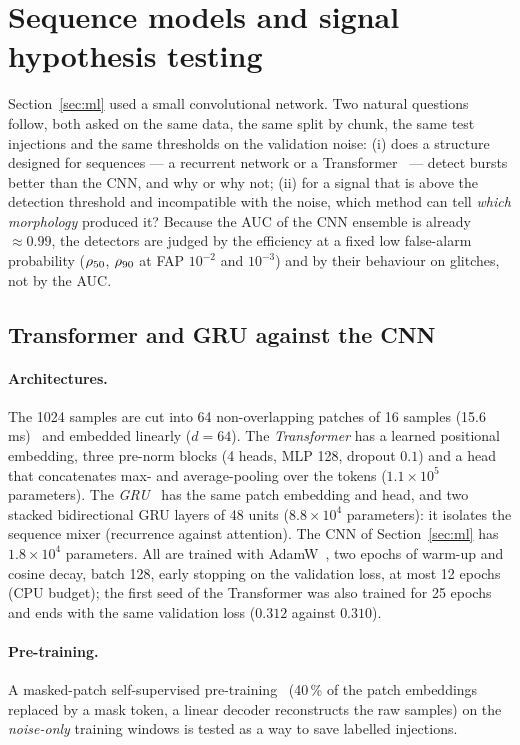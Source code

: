 \section{Sequence models and signal hypothesis testing}\label{sec:seq}

Section~\ref{sec:ml} used a small convolutional network. Two natural questions follow, both asked on the same data, the same split by chunk, the same test injections and the same thresholds on the validation noise: (i) does a structure designed for sequences --- a recurrent network or a Transformer~\cite{Vaswani} --- detect bursts better than the CNN, and why or why not; (ii) for a signal that is above the detection threshold and incompatible with the noise, which method can tell \emph{which morphology} produced it?
Because the AUC of the CNN ensemble is already $\approx0.99$, the detectors are judged by the efficiency at a fixed low false-alarm probability ($\rho_{50}$, $\rho_{90}$ at FAP $10^{-2}$ and $10^{-3}$) and by their behaviour on glitches, not by the AUC.

\subsection{Transformer and GRU against the CNN}
\paragraph{Architectures.} The 1024 samples are cut into 64 non-overlapping patches of 16 samples (15.6\,ms)~\cite{ViT} and embedded linearly ($d=64$). The \emph{Transformer} has a learned positional embedding, three pre-norm blocks (4 heads, MLP 128, dropout $0.1$) and a head that concatenates max- and average-pooling over the tokens ($1.1\times10^5$ parameters). The \emph{GRU}~\cite{GRU} has the same patch embedding and head, and two stacked bidirectional GRU layers of 48 units ($8.8\times10^4$ parameters): it isolates the sequence mixer (recurrence against attention). The CNN of Section~\ref{sec:ml} has $1.8\times10^4$ parameters.
All are trained with AdamW~\cite{AdamW}, two epochs of warm-up and cosine decay, batch 128, early stopping on the validation loss, at most 12 epochs (CPU budget); the first seed of the Transformer was also trained for 25 epochs and ends with the same validation loss ($0.312$ against $0.310$).
\paragraph{Pre-training.} A masked-patch self-supervised pre-training~\cite{MAE} (40\,\% of the patch embeddings replaced by a mask token, a linear decoder reconstructs the raw samples) on the \emph{noise-only} training windows is tested as a way to save labelled injections.

